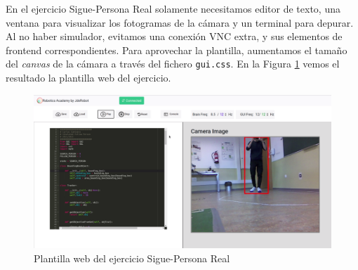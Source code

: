 En el ejercicio Sigue-Persona Real solamente necesitamos editor de texto, una ventana para visualizar los fotogramas de la cámara y un terminal para depurar. Al no haber simulador, evitamos una conexión VNC extra, y sus elementos de frontend correspondientes. Para aprovechar la plantilla, aumentamos el tamaño del \textit{canvas} de la cámara a través del fichero \texttt{gui.css}. En la Figura \ref{fig:plantilla_web_real_follow_person} vemos el resultado la plantilla web del ejercicio.\\

\begin{figure} [H]
  \begin{center}
    \includegraphics[width=15cm]{imagenes/cap5/plantilla-web-real-follow-person.png}
  \end{center}
  \caption[Plantilla web del ejercicio Sigue-Persona Real]{Plantilla web del ejercicio Sigue-Persona Real}
  \label{fig:plantilla_web_real_follow_person}
\end{figure}


